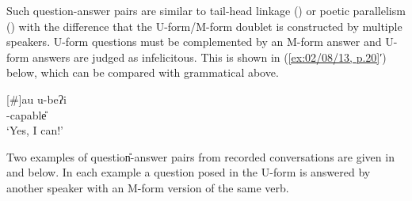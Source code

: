 Such question-answer pairs are similar to tail-head linkage ()
or poetic parallelism () with the difference
that the U-form/M-form doublet is constructed by multiple speakers.
U-form questions must be complemented by an M-form answer
and U-form answers are judged as infelicitous.
This is shown in (\ref{ex:02/08/13, p.20}′) below,
which can be compared with grammatical  above.

\begin{multicols}{2}
	\begin{exe}
			\begin{xlist}
			\end{xlist}
		\sn{\txrf{el. 03/10/14 p.112}}
			\begin{xlist}
				[{\#}]{\gll	au u-beʔi\\
									{\au} \qu-capable{\U}\\
						\glt	`Yes, I can!'}
			\end{xlist}
	\end{exe}
\end{multicols}

Two examples of question{\U}-answer{\M} pairs from recorded
conversations are given in 
and  below.
In each example a question posed in the U-form is answered
by another speaker with an M-form version of the same verb.

